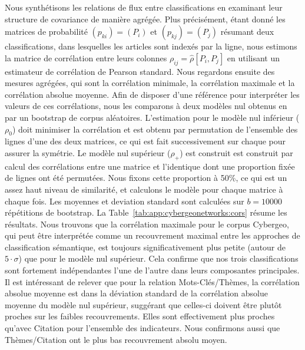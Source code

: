 {Nous synthétisons les relations de flux entre classifications en examinant leur structure de covariance de manière agrégée. Plus précisément, étant donné les matrices de probabilité $(p_{ki}) = (P_i)$ et $(p_{kj}) = (P_j)$ résumant deux classifications, dans lesquelles les articles sont indexés par la ligne, nous estimons la matrice de corrélation entre leurs colonnes $\rho_{ij} = \hat{\rho}\left[P_i,P_j\right]$ en utilisant un estimateur de corrélation de Pearson standard. Nous regardons ensuite des mesures agrégées, qui sont la corrélation minimale, la corrélation maximale et la corrélation absolue moyenne. Afin de disposer d'une référence pour interpréter les valeurs de ces corrélations, nous les comparons à deux modèles nul obtenus en par un bootstrap de corpus aléatoires. L'estimation pour le modèle nul inférieur ($\rho_0$) doit minimiser la corrélation et est obtenu par permutation de l'ensemble des lignes d'une des deux matrices, ce qui est fait successivement sur chaque pour assurer la symétrie. Le modèle nul supérieur ($\rho_+$) est construit est construit par calcul des corrélations entre une matrice et l'identique dont une proportion fixée de lignes ont été permutées. Nous fixons cette proportion à 50\%, ce qui est un assez haut niveau de similarité, et calculons le modèle pour chaque matrice à chaque fois. Les moyennes et deviation standard sont calculées sur $b=10000$ répétitions de bootstrap. La Table~\ref{tab:app:cybergeonetworks:cors} résume les résultats. Nous trouvons que la corrélation maximale pour le corpus Cybergeo, qui peut être interprétée comme un recouvrement maximal entre les approches de classification sémantique, est toujours significativement plus petite (autour de $5\cdot \sigma$) que pour le modèle nul supérieur. Cela confirme que nos trois classifications sont fortement indépendantes l'une de l'autre dans leurs composantes principales. Il est intéressant de relever que pour la relation Mots-Clés/Thèmes, la corrélation absolue moyenne est dans la déviation standard de la corrélation absolue moyenne du modèle nul supérieur, suggérant que celles-ci doivent être plutôt proches sur les faibles recouvrements. Elles sont effectivement plus proches qu'avec Citation pour l'ensemble des indicateurs. Nous confirmons aussi que Thèmes/Citation ont le plus bas recouvrement absolu moyen.
}


